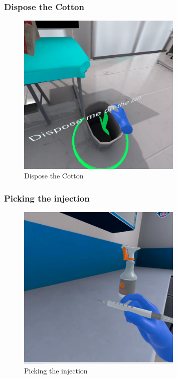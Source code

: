 \subsubsection{Dispose the Cotton}
\begin{figure}[h]
	\centering
	\includegraphics[width=0.7\textwidth, height=0.3\textheight]{Images/Dispose the Cotton.png}
	\caption{Dispose the Cotton}
	\label{fig:Dispose the Cotton}
\end{figure}
\newpage
\subsubsection{Picking the injection}
\begin{figure}[h]
	\centering
	\includegraphics[width=0.7\textwidth, height=0.3\textheight]{Images/Picking the injection.png}
	\caption{Picking the injection}
	\label{fig:Picking the injection}
\end{figure}

